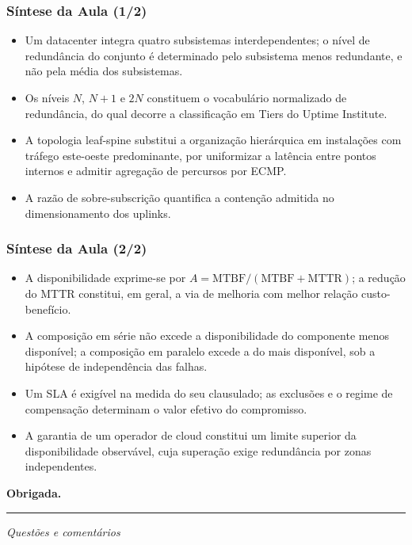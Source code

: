 \documentclass[aspectratio=169]{beamer}
\begin{document}
\begin{frame}
\frametitle{Síntese da Aula \textcolor{NudeTaupe}{\small(1/2)}}
\begin{itemize}
    \setlength\itemsep{0.35cm}
    \item Um datacenter integra quatro subsistemas interdependentes; o nível de redundância do conjunto é determinado pelo subsistema menos redundante, e não pela média dos subsistemas.
    \item Os níveis $N$, $N+1$ e $2N$ constituem o vocabulário normalizado de redundância, do qual decorre a classificação em Tiers do Uptime Institute.
    \item A topologia leaf-spine substitui a organização hierárquica em instalações com tráfego este-oeste predominante, por uniformizar a latência entre pontos internos e admitir agregação de percursos por ECMP.
    \item A razão de sobre-subscrição quantifica a contenção admitida no dimensionamento dos uplinks.
\end{itemize}
\end{frame}

\begin{frame}
\frametitle{Síntese da Aula \textcolor{NudeTaupe}{\small(2/2)}}
\begin{itemize}
    \setlength\itemsep{0.35cm}
    \item A disponibilidade exprime-se por $A = \mathrm{MTBF}/(\mathrm{MTBF}+\mathrm{MTTR})$; a redução do MTTR constitui, em geral, a via de melhoria com melhor relação custo-benefício.
    \item A composição em série não excede a disponibilidade do componente menos disponível; a composição em paralelo excede a do mais disponível, sob a hipótese de independência das falhas.
    \item Um SLA é exigível na medida do seu clausulado; as exclusões e o regime de compensação determinam o valor efetivo do compromisso.
    \item A garantia de um operador de cloud constitui um limite superior da disponibilidade observável, cuja superação exige redundância por zonas independentes.
\end{itemize}
\end{frame}

\begin{frame}[plain]
  \vspace*{3cm}
  \begin{center}
    \Huge\bfseries\textcolor{TextEspresso}{Obrigada.}\par
    \vspace{0.5cm}
    {\color{NudeTaupe}\rule{2cm}{0.5pt}}\par
    \vspace{0.5cm}
    \Large\textcolor{TextEspresso}{\itshape Questões e comentários}
  \end{center}
\end{frame}
\end{document}
